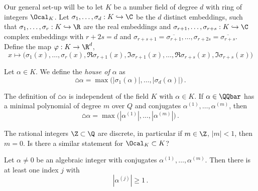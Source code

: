 Our general set-up will be to let \( K \) be a number field of degree \( d \) with ring of integers \( \Ocal_K \).
Let \( \sigma_1, \dotsc, \sigma_d: K \hookrightarrow \C \) be the \( d \) distinct embeddings, such that \( \sigma_1, \dotsc, \sigma_r: K \hookrightarrow \R \) are the real embeddings and \( \sigma_{r+1}, \dotsc, \sigma_{r+s}: K \hookrightarrow \C \) complex embeddings with \( r + 2s = d \) and \( \sigma_{r+s+1} = \overline{\sigma_{r+1}}, \dotsc, \sigma_{r+2s} = \overline{\sigma_{r+s}} \).
Define the map \( \varphi: K \to \R^d \),
\[ x \mapsto \big( \sigma_1(x), \dotsc, \sigma_r(x), \Re \sigma_{r+1}(x), \Im \sigma_{r+1}(x), \dotsc, \Re \sigma_{r+s}(x), \Im \sigma_{r+s}(x) \big) \]

\begin{defn*}[House] 
	Let \( \alpha \in K \).
	We define the \emph{house of \( \alpha \)} as
	\[ \house{\alpha} = \max \big( |\sigma_1(\alpha)|, \dotsc, |\sigma_d(\alpha)| \big) \,. \]
\end{defn*}

\begin{rem*}
	The definition of \( \house{\alpha} \) is independent of the field \( K \) with \( \alpha \in K \).
	If \( \alpha \in \QQbar \) has a minimal polynomial of degree \( m \) over \( Q \) and conjugates \( \alpha^{(1)}, \dotsc, \alpha^{(m)} \), then
	\[ \house{\alpha} = \max \big( |\alpha^{(1)}|, \dotsc, |\alpha^{(m)}| \big) \,. \]
\end{rem*}

\begin{frage*}
	The rational integers \( \Z \subset \Q \) are discrete, in particular if \( m \in \Z \), \( |m| < 1 \), then \( m=0 \).
	Is there a similar statement for \( \Ocal_K \subset K \)?
\end{frage*}

\begin{obs*}
	Let \( \alpha \neq 0 \) be an algebraic integer with conjugates \( \alpha^{(1)}, \dotsc, \alpha^{(m)} \).
	Then there is at least one index \( j \) with
	\[ |\alpha^{(j)}| \geq 1 \,. \]
\end{obs*}